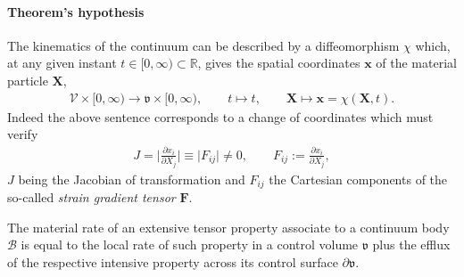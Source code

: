 \paragraph{Theorem's hypothesis}
The kinematics of the continuum can be described by a diffeomorphism $\chi$ which, at any given instant $t\in [0,\infty)\subset\mathbb{R}$, gives the spatial coordinates $\mathbf{x}$ of the material particle $\mathbf{X}$,
\begin{align*}
\mathscr{V}\times[0,\infty)\rightarrow \mathfrak{v}\times[0,\infty), \qquad
t \mapsto t, \qquad \mathbf{X}\mapsto\mathbf{x}=\chi(\mathbf{X},t).
\end{align*}
Indeed the above sentence corresponds to a change of coordinates which must verify
\begin{align*}
J=\bigg\vert\frac{\partial{x}_i}{\partial{X}_j}\bigg\vert\equiv
\big\vert{F_{ij}}\big\vert\neq{0}, \qquad
F_{ij}:=\frac{\partial{x}_i}{\partial{X}_j},
\end{align*}
$J$ being the Jacobian of transformation and $F_{ij}$ the Cartesian components of the so-called {\em strain gradient tensor} $\mathbf{F}$.
\begin{theorem*}
The material rate of an extensive tensor property associate to a continuum body $\mathscr{B}$ is equal to the local rate of such property in a control volume $\mathfrak{v}$ plus the efflux of the respective intensive property across its control surface $\partial\mathfrak{v}$.
\end{theorem*}
